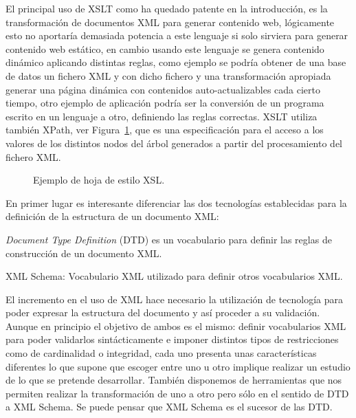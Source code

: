 \begin{description}
El principal uso de XSLT como ha quedado patente en la introducción, es la transformación
de documentos XML para generar contenido web, lógicamente esto no aportaría demasiada potencia
a este lenguaje si solo sirviera para generar contenido web estático, en cambio usando
este lenguaje se genera contenido dinámico aplicando distintas reglas, como ejemplo se
podría obtener de una base de datos un fichero XML y con dicho fichero y una transformación
apropiada generar una página dinámica con contenidos auto-actualizables cada cierto tiempo, otro 
ejemplo de aplicación podría ser la conversión de un programa escrito en un lenguaje a otro, definiendo las reglas correctas. 
XSLT utiliza también \gls{XPath}, ver Figura~\ref{fig:xsl-example}, que es una especificación
para el acceso a los valores de los distintos nodos del árbol generados a partir del procesamiento
del fichero XML. 

\begin{figure}[!hbp]
\centering

\caption{Ejemplo de hoja de estilo XSL.}
\label{fig:xsl-example}
\end{figure}


\item[\gls{XML Schema}~\cite{XMLSchema}.] En primer lugar es interesante diferenciar las dos
tecnologías establecidas para la definición de la estructura de un documento
XML: \begin{inparaenum}
     \item \textit{Document Type Definition} (\gls{DTD}) es un vocabulario para definir las
     reglas de construcción de un documento XML.     
     \item XML Schema: Vocabulario XML utilizado para definir otros vocabularios
     XML.  
     \end{inparaenum}

El incremento en el uso de \gls{XML} hace necesario la utilización de tecnología para poder
expresar la estructura del documento y así proceder a su validación. Aunque en principio el objetivo de ambos es el mismo: 
definir vocabularios XML para poder validarlos sintácticamente e imponer distintos tipos de 
restricciones como de cardinalidad o integridad, cada uno presenta unas características diferentes 
lo que supone que escoger entre uno u otro implique realizar un estudio de lo que se pretende desarrollar.
También disponemos de herramientas que nos permiten realizar la transformación de uno a
otro pero sólo en el sentido de DTD a XML Schema. Se puede pensar que XML Schema es el
sucesor de las DTD.


\end{description}

